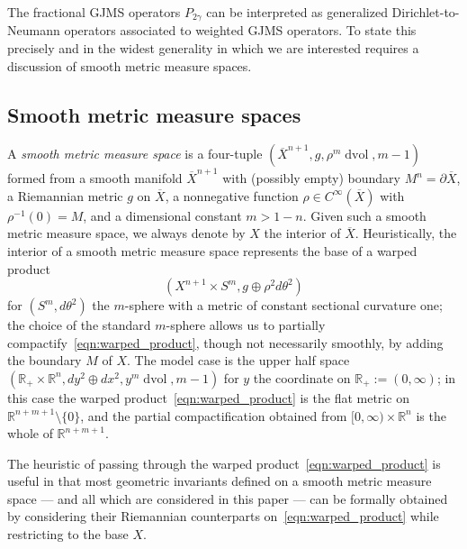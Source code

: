 \documentclass{amsart}
\theoremstyle{definition}
\theoremstyle{remark}
\numberwithin{equation}{section}
\begin{document}
The fractional GJMS operators $P_{2\gamma}$ can be interpreted as generalized Dirichlet-to-Neumann operators associated to weighted GJMS operators.  To state this precisely and in the widest generality in which we are interested requires a discussion of smooth metric measure spaces.

\subsection{Smooth metric measure spaces}
\label{subsec:bg/smms}

A \emph{smooth metric measure space} is a four-tuple $({\overline{X}}^{n+1},g,\rho^m\operatorname{dvol},m-1)$ formed from a smooth manifold ${\overline{X}}^{n+1}$ with (possibly empty) boundary $M^n=\partial{\overline{X}}$, a Riemannian metric $g$ on ${\overline{X}}$, a nonnegative function $\rho\in C^\infty({\overline{X}})$ with $\rho^{-1}(0)=M$, and a dimensional constant $m>1-n$.  Given such a smooth metric measure space, we always denote by $X$ the interior of ${\overline{X}}$.  Heuristically, the interior of a smooth metric measure space represents the base of a warped product
\begin{equation}
\label{eqn:warped_product}
\left( X^{n+1}\times S^m, g\oplus\rho^2 d\theta^2\right)
\end{equation}
for $(S^m,d\theta^2)$ the $m$-sphere with a metric of constant sectional curvature one; the choice of the standard $m$-sphere allows us to partially compactify~\eqref{eqn:warped_product}, though not necessarily smoothly, by adding the boundary $M$ of $X$.  The model case is the upper half space $({\mathbb{R}}_+\times{\mathbb{R}}^n,dy^2\oplus dx^2,y^m\operatorname{dvol},m-1)$ for $y$ the coordinate on ${\mathbb{R}}_+:=(0,\infty)$; in this case the warped product~\eqref{eqn:warped_product} is the flat metric on ${\mathbb{R}}^{n+m+1}\setminus\{0\}$, and the partial compactification obtained from $[0,\infty)\times{\mathbb{R}}^n$ is the whole of ${\mathbb{R}}^{n+m+1}$.

The heuristic of passing through the warped product~\eqref{eqn:warped_product} is useful in that most geometric invariants defined on a smooth metric measure space --- and all which are considered in this paper --- can be formally obtained by considering their Riemannian counterparts on~\eqref{eqn:warped_product} while restricting to the base $X$.
\end{document}

